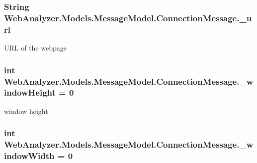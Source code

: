 \subsubsection[{\+\_\+url}]{\setlength{\rightskip}{0pt plus 5cm}String Web\+Analyzer.\+Models.\+Message\+Model.\+Connection\+Message.\+\_\+url\hspace{0.3cm}{\ttfamily [private]}}\label{class_web_analyzer_1_1_models_1_1_message_model_1_1_connection_message_a8b546b2299ebc28fbe93f158a7e1742a}


U\+R\+L of the webpage 

\hypertarget{class_web_analyzer_1_1_models_1_1_message_model_1_1_connection_message_a9a2326a089eb048ce429e3bcceb54918}{}
\subsubsection[{\+\_\+window\+Height}]{\setlength{\rightskip}{0pt plus 5cm}int Web\+Analyzer.\+Models.\+Message\+Model.\+Connection\+Message.\+\_\+window\+Height = 0\hspace{0.3cm}{\ttfamily [private]}}\label{class_web_analyzer_1_1_models_1_1_message_model_1_1_connection_message_a9a2326a089eb048ce429e3bcceb54918}


window height 

\hypertarget{class_web_analyzer_1_1_models_1_1_message_model_1_1_connection_message_a0dd807c1966d8e6d90b0e764eacca950}{}
\subsubsection[{\+\_\+window\+Width}]{\setlength{\rightskip}{0pt plus 5cm}int Web\+Analyzer.\+Models.\+Message\+Model.\+Connection\+Message.\+\_\+window\+Width = 0\hspace{0.3cm}{\ttfamily [private]}}\label{class_web_analyzer_1_1_models_1_1_message_model_1_1_connection_message_a0dd807c1966d8e6d90b0e764eacca950}


